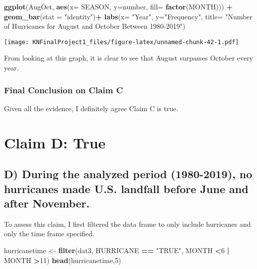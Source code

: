 \documentclass[
]{article}
\newenvironment{Shaded}{\begin{snugshade}}{\end{snugshade}}
\newcommand{\DataTypeTok}[1]{\textcolor[rgb]{0.13,0.29,0.53}{#1}}
\newcommand{\DecValTok}[1]{\textcolor[rgb]{0.00,0.00,0.81}{#1}}
\newcommand{\KeywordTok}[1]{\textcolor[rgb]{0.13,0.29,0.53}{\textbf{#1}}}
\newcommand{\NormalTok}[1]{#1}
\newcommand{\OperatorTok}[1]{\textcolor[rgb]{0.81,0.36,0.00}{\textbf{#1}}}
\newcommand{\StringTok}[1]{\textcolor[rgb]{0.31,0.60,0.02}{#1}}
\begin{document}
\begin{Shaded}
\begin{Highlighting}[]
\KeywordTok{ggplot}\NormalTok{(AugOct, }\KeywordTok{aes}\NormalTok{(}\DataTypeTok{x=}\NormalTok{ SEASON, }\DataTypeTok{y=}\NormalTok{number, }\DataTypeTok{fill=} \KeywordTok{factor}\NormalTok{(MONTH))) }\OperatorTok{+}\StringTok{ }
\StringTok{  }\KeywordTok{geom_bar}\NormalTok{(}\DataTypeTok{stat =} \StringTok{"identity"}\NormalTok{)}\OperatorTok{+}
\StringTok{  }\KeywordTok{labs}\NormalTok{(}\DataTypeTok{x=} \StringTok{"Year"}\NormalTok{, }\DataTypeTok{y=}\StringTok{"Frequency"}\NormalTok{, }\DataTypeTok{title=} \StringTok{"Number of Hurricanes for August and October Between 1980-2019"}\NormalTok{)}
\end{Highlighting}
\end{Shaded}

\texttt{[image: KNFinalProject1\_files/figure-latex/unnamed-chunk-42-1.pdf]}

From looking at this graph, it is clear to see that August surpasses
October every year.

\hypertarget{final-conclusion-on-claim-c}{%
\subsubsection{Final Conclusion on Claim
C}\label{final-conclusion-on-claim-c}}

Given all the evidence, I definitely agree Claim C is true.

\hypertarget{claim-d-true}{%
\section{Claim D: True}\label{claim-d-true}}

\hypertarget{d-during-the-analyzed-period-1980-2019-no-hurricanes-made-u.s.-landfall-before-june-and-after-november.}{%
\subsection{D) During the analyzed period (1980-2019), no hurricanes
made U.S. landfall before June and after
November.}\label{d-during-the-analyzed-period-1980-2019-no-hurricanes-made-u.s.-landfall-before-june-and-after-november.}}

To assess this claim, I first filtered the data frame to only include
hurricanes and only the time frame specified.

\begin{Shaded}
\begin{Highlighting}[]
\NormalTok{hurricanetime <-}\StringTok{ }\KeywordTok{filter}\NormalTok{(dat3, HURRICANE }\OperatorTok{==}\StringTok{ "TRUE"}\NormalTok{, MONTH }\OperatorTok{<}\DecValTok{6} \OperatorTok{|}\StringTok{ }\NormalTok{MONTH }\OperatorTok{>}\DecValTok{11}\NormalTok{)}
\KeywordTok{head}\NormalTok{(hurricanetime,}\DecValTok{5}\NormalTok{)}
\end{Highlighting}
\end{Shaded}
\end{document}

